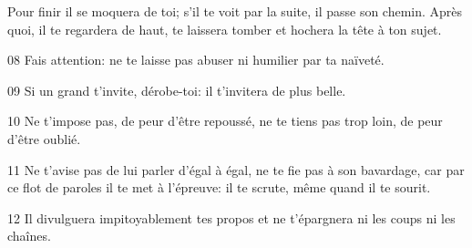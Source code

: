 Pour finir il se moquera de toi; s’il te voit par la suite, il passe son chemin. Après quoi, il te regardera de haut, te laissera tomber et hochera la tête à ton sujet.

08 Fais attention: ne te laisse pas abuser ni humilier par ta naïveté.

09 Si un grand t’invite, dérobe-toi: il t’invitera de plus belle.

10 Ne t’impose pas, de peur d’être repoussé, ne te tiens pas trop loin, de peur d’être oublié.

11 Ne t’avise pas de lui parler d’égal à égal, ne te fie pas à son bavardage, car par ce flot de paroles il te met à l’épreuve: il te scrute, même quand il te sourit.

12 Il divulguera impitoyablement tes propos et ne t’épargnera ni les coups ni les chaînes.
